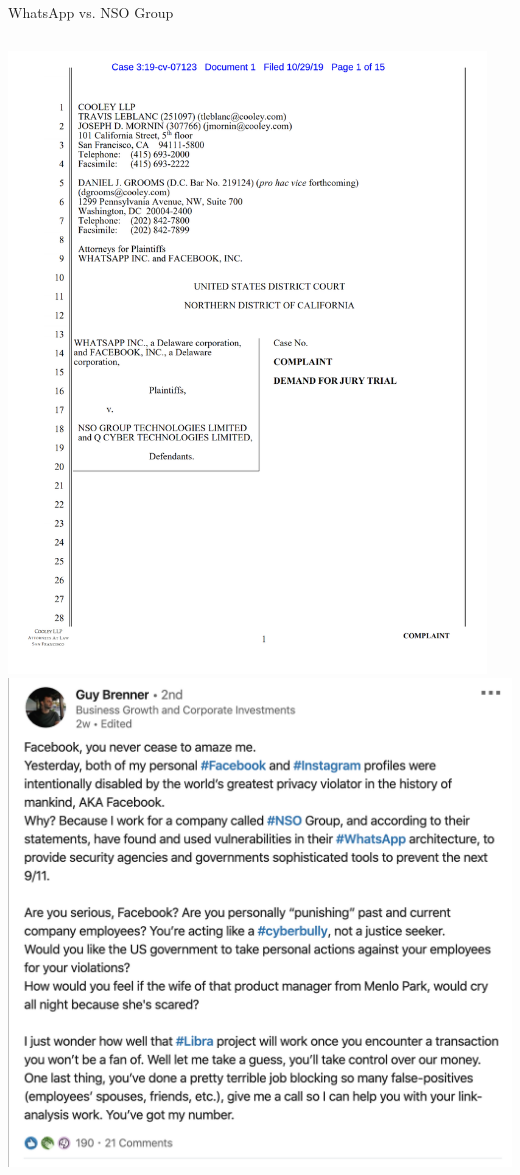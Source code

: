 \documentclass[nobackground,dvipsnames,table,aspectratio=169]{beamer}
\begin{document}
\begin{frame}{WhatsApp vs. NSO Group}
    \begin{columns}
            \includegraphics[width=0.95\textwidth]{whatsapp-vs-nso-court-doc}
            \includegraphics[width=\textwidth]{nso-rant}
    \end{columns}
\end{frame}
\end{document}

